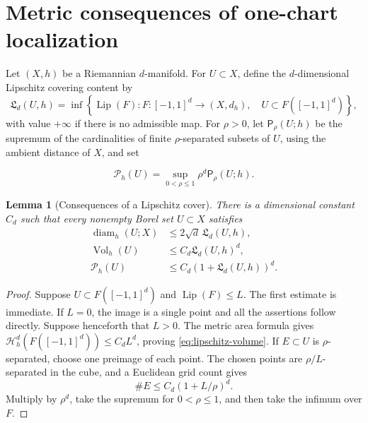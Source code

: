 \documentclass[10pt,a4paper]{article}
\numberwithin{equation}{section}
\newtheorem{lemma}[theorem]{Lemma}
\theoremstyle{definition}
\theoremstyle{remark}
\newcommand{\diam}{\operatorname{diam}}
\newcommand{\Vol}{\operatorname{Vol}}
\newcommand{\Lip}{\operatorname{Lip}}
\begin{document}
\section{Metric consequences of one-chart localization}
\label{sec:lipschitz}

Let $(X,h)$ be a Riemannian $d$-manifold.  For $U\subset X$, define the
$d$-dimensional Lipschitz covering content by
\begin{equation}
 \mathfrak L_d(U,h)=\inf\left\{\Lip(F):
 F:[-1,1]^d\longrightarrow(X,d_h),\quad
 U\subset F([-1,1]^d)\right\},
 \label{eq:lipschitz-content}
\end{equation}
with value $+\infty$ if there is no admissible map.  For $\rho>0$, let
$\mathsf P_\rho(U;h)$ be the supremum of the cardinalities of finite
$\rho$-separated subsets of $U$, using the ambient distance of $X$, and set

\begin{equation}
 \mathscr P_h(U)=\sup_{0<\rho\le1}\rho^d\mathsf P_\rho(U;h).
 \label{eq:normalized-packing}
\end{equation}

\begin{lemma}[Consequences of a Lipschitz cover]
\label{lem:lipschitz-certificates}
There is a dimensional constant $C_d$ such that every nonempty Borel set
$U\subset X$ satisfies
\begin{align}
 \diam_h(U;X)&\le2\sqrt d\,\mathfrak L_d(U,h),
 \label{eq:lipschitz-diameter}\\
 \Vol_h(U)&\le C_d\mathfrak L_d(U,h)^d,
 \label{eq:lipschitz-volume}\\
 \mathscr P_h(U)&\le C_d(1+\mathfrak L_d(U,h))^d.
 \label{eq:lipschitz-packing}
\end{align}
\end{lemma}

\begin{proof}
Suppose $U\subset F([-1,1]^d)$ and $\Lip(F)\le L$.  The first estimate is
immediate.  If $L=0$, the image is a single point and all the assertions
follow directly.  Suppose henceforth that $L>0$.
The metric area formula \cite{Kirchheim1994} gives
$\mathcal H_h^d(F([-1,1]^d))\le C_dL^d$, proving
\eqref{eq:lipschitz-volume}.  If $E\subset U$ is $\rho$-separated, choose one
preimage of each point.  The chosen points are $\rho/L$-separated in the
cube, and a Euclidean grid count gives
\[
 \#E\le C_d(1+L/\rho)^d.
\]
Multiply by $\rho^d$, take the supremum for $0<\rho\le1$, and then take the
infimum over $F$.
\end{proof}
\end{document}
